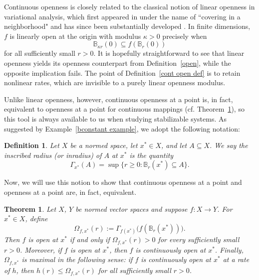 \documentclass[pdflatex,sn-mathphys-num]{sn-jnl}%
\theoremstyle{thmstyleone}%
\newtheorem{theorem}{Theorem}%
\theoremstyle{thmstyletwo}%
\theoremstyle{thmstylethree}%
\newtheorem{definition}{Definition}%
\begin{document}
    Continuous openness is closely related to the classical notion of linear openness in variational analysis, which first appeared in \cite{milyutin} under the name of ``covering in a neighborhood" and has since been substantially developed \cite{mordukhovich2,rockafellar,ioffe}.  In finite dimensions, \(f\) is linearly open at the origin with modulus \(\kappa>0\) precisely when
    \[
    \mathbb{B}_{\kappa r}(0)\subseteq f(\mathbb{B}_r(0))
    \]
    for all sufficiently small \(r>0\).  It is hopefully straightforward to see that linear openness yields its openness counterpart from Definition~\ref{open}, while the opposite implication fails. The point of Definition~\ref{cont open def} is to retain nonlinear rates, which are invisible to a purely linear openness modulus.
    
    Unlike linear openness, however, continuous openness at a point is, in fact, equivalent to openness at a point for continuous mappings (cf. Theorem~\ref{open cont open equiv}), so this tool is always available to us when studying stabilizable systems.  As suggested by Example~\ref{bconstant example}, we adopt the following notation:
    

    \begin{definition}\label{b constant def}
        Let $X$ be a normed space, let $x^* \in X$, and let $A\subseteq X$.  We say the \emph{inscribed radius} (or \emph{inradius}) \emph{of $A$ at $x^*$} is the quantity
        $$
            \Gamma_{x^*}(A)=\sup \{r\geq 0:\mathbb{B}_r(x^*)\subseteq A\}.
        $$
    \end{definition}
    
    
    Now, we will use this notion to show that continuous openness at a point and openness at a point are, in fact, equivalent.

    \begin{theorem}\label{open cont open equiv}
        Let $X$, $Y$ be normed vector spaces and suppose $f:X \rightarrow Y$.  For $x^*\in X$, define
        $$
            \Omega_{f,x^*}(r):=\Gamma_{f(x^*)}\big(f(\mathbb{B}_r(x^*))\big).
        $$
        Then $f$ is open at $x^*$ if and only if $\Omega_{f,x^*}(r)>0$ for every sufficiently small $r>0$.  Moreover, if $f$ is open at $x^*$, then $f$ is continuously open at $x^*$.  Finally, $\Omega_{f,x^*}$ is maximal in the following sense: if $f$ is continuously open at $x^*$ at a rate of $h$, then $h(r)\leq \Omega_{f,x^*}(r)$ for all sufficiently small $r>0$.
    \end{theorem}
\end{document}
